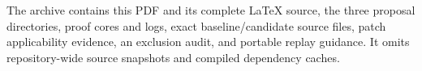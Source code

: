 \documentclass[11pt,letterpaper]{article}
\begin{document}
The archive contains this PDF and its complete LaTeX source, the three proposal directories, proof cores and logs, exact baseline/candidate source files, patch applicability evidence, an exclusion audit, and portable replay guidance. It omits repository-wide source snapshots and compiled dependency caches.
\end{document}
